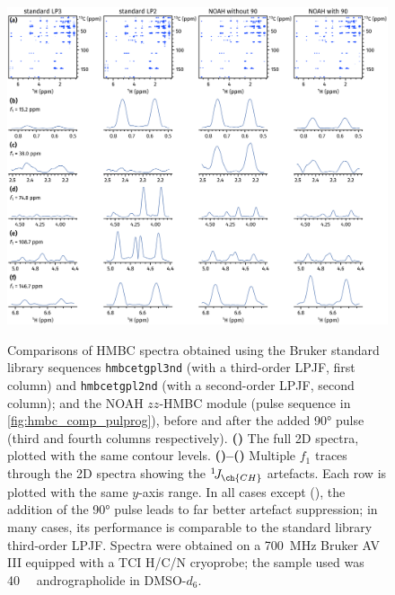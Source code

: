 \documentclass[a4paper,11pt]{article}
\newcommand{\carbon}{\ch{^{13}C}}
\newcommand{\onejch}{{}^1\!J_{\ch{CH}}}
\newcommand*{\andro}{Spectra were obtained on a \SI{700}{\MHz} Bruker AV III equipped with a TCI H/C/N cryoprobe; the sample used was \SI{40}{\milli\molar} andrographolide in DMSO-\(d_6\).}
\begin{document}
\begin{refsection}
\begin{figure}[H]
    \centering
    \includegraphics[width=\textwidth]{hmbc_si_andro.png}
    {\label{fig:hmbc_si_andro_overall}}
    {\label{fig:hmbc_si_andro_trace1}}
    {\label{fig:hmbc_si_andro_trace2}}
    {\label{fig:hmbc_si_andro_trace3}}
    {\label{fig:hmbc_si_andro_trace4}}
    {\label{fig:hmbc_si_andro_trace5}}
    \caption{
        Comparisons of HMBC spectra obtained using the Bruker standard library sequences\autocite{Cicero2001JMR} \texttt{hmbcetgpl3nd} (with a third-order LPJF, first column) and \texttt{hmbcetgpl2nd} (with a second-order LPJF, second column); and the NOAH \(zz\)-HMBC module (pulse sequence in \cref{fig:hmbc_comp_pulprog}), before and after the added \carbon{} \ang{90} pulse (third and fourth columns respectively).
        \textbf{()} The full 2D spectra, plotted with the same contour levels.
        \textbf{()--()} Multiple \(f_1\) traces through the 2D spectra showing the \(\onejch{}\) artefacts.
        Each row is plotted with the same \(y\)-axis range.
        In all cases except (), the addition of the \ang{90} pulse leads to far better artefact suppression; in many cases, its performance is comparable to the standard library third-order LPJF.
        \andro{}
    }
    \label{fig:hmbc_si_andro}
\end{figure}


\end{refsection}
\end{document}
